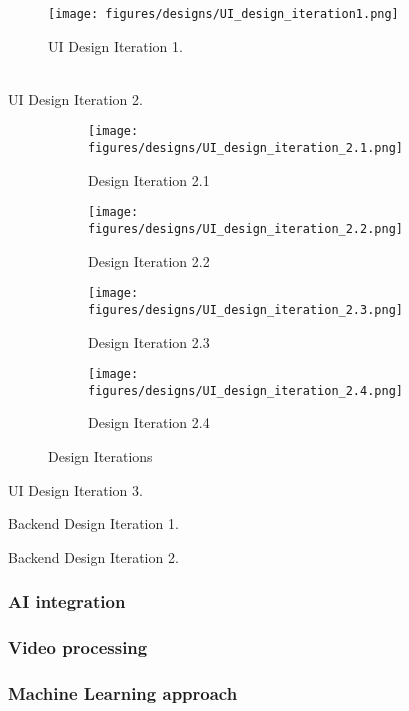 \documentclass[12pt,oneside,letterpaper,english]{article}
\begin{document}
\begin{figure}[H]
    \centering
    \texttt{[image: figures/designs/UI\_design\_iteration1.png]}
    \caption{UI Design Iteration 1.}
    \label{fig:UI_design_1}
\end{figure}

\\
UI Design Iteration 2.
\begin{figure}[H]
    \centering
    \begin{subfigure}[b]{0.45\textwidth}
        \texttt{[image: figures/designs/UI\_design\_iteration\_2.1.png]}
        \caption{Design Iteration 2.1}
        \label{fig:UI_design_2.1}
    \end{subfigure}
    \hfill
    \begin{subfigure}[b]{0.45\textwidth}
        \texttt{[image: figures/designs/UI\_design\_iteration\_2.2.png]}
        \caption{Design Iteration 2.2}
        \label{fig:UI_design_2.2}
    \end{subfigure}

    \medskip

    \begin{subfigure}[b]{0.45\textwidth}
        \texttt{[image: figures/designs/UI\_design\_iteration\_2.3.png]}
        \caption{Design Iteration 2.3}
        \label{fig:UI_design_2.3}
    \end{subfigure}
    \hfill
    \begin{subfigure}[b]{0.45\textwidth}
        \texttt{[image: figures/designs/UI\_design\_iteration\_2.4.png]}
        \caption{Design Iteration 2.4}
        \label{fig:UI_design_2.4}
    \end{subfigure}
    \caption{Design Iterations}
\end{figure}

UI Design Iteration 3.

Backend Design Iteration 1.

Backend Design Iteration 2.


\subsubsection{AI integration}
\subsubsection{Video processing}
\subsubsection{Machine Learning approach}
\end{document}
